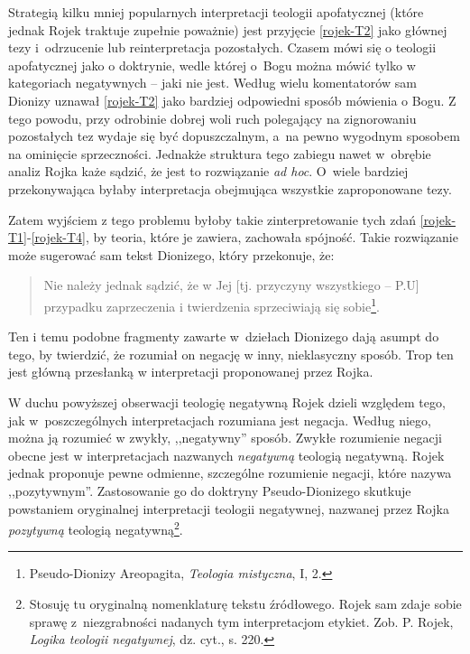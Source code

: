 Strategią kilku mniej popularnych interpretacji teologii apofatycznej
(które jednak Rojek traktuje zupełnie poważnie)
 jest przyjęcie \eqref{rojek-T2} jako głównej tezy i~odrzucenie lub reinterpretacja pozostałych.
Czasem
mówi się o teologii apofatycznej jako o doktrynie, wedle
której o~Bogu można mówić tylko w kategoriach negatywnych -- jaki nie
jest. Według wielu komentatorów sam Dionizy uznawał \eqref{rojek-T2} jako bardziej odpowiedni sposób mówienia o Bogu.
Z tego powodu, przy odrobinie dobrej woli ruch polegający na zignorowaniu pozostałych tez wydaje się być
dopuszczalnym, a~na pewno wygodnym sposobem na ominięcie sprzeczności. Jednakże struktura tego zabiegu nawet w~obrębie analiz Rojka każe sądzić, że jest to rozwiązanie \textit{ad hoc}. O~wiele
bardziej przekonywająca byłaby interpretacja obejmująca wszystkie
zaproponowane tezy.

Zatem wyjściem z tego problemu byłoby takie zinterpretowanie tych zdań \eqref{rojek-T1}-\eqref{rojek-T4},
by teoria, które je zawiera, zachowała spójność. Takie rozwiązanie może
sugerować sam tekst Dionizego, który przekonuje, że:

\begin{quote}
    Nie należy jednak sądzić, że w Jej [tj. przyczyny wszystkiego -- P.U]
przypadku zaprzeczenia i twierdzenia sprzeciwiają się
sobie\footnote{Pseudo-Dionizy Areopagita, \textit{Teologia mistyczna},
 I, 2.}.
\end{quote}
Ten i temu podobne fragmenty zawarte w~dziełach Dionizego dają asumpt do tego, by twierdzić, że rozumiał on negację w inny, nieklasyczny sposób.
Trop ten jest główną przesłanką w interpretacji proponowanej przez
Rojka.



W duchu powyższej obserwacji teologię negatywną Rojek dzieli względem tego, jak
w~poszczególnych interpretacjach rozumiana jest negacja. Według niego,
można ją rozumieć w zwykły, ,,negatywny'' sposób. Zwykłe rozumienie
negacji obecne jest w interpretacjach nazwanych \textit{negatywną}
teologią negatywną. Rojek jednak proponuje pewne odmienne, szczególne
rozumienie negacji, które nazywa ,,pozytywnym''. Zastosowanie go do
doktryny Pseudo-Dionizego skutkuje powstaniem oryginalnej interpretacji teologii negatywnej, nazwanej przez Rojka
\textit{pozytywną} teologią negatywną\footnote{Stosuję tu oryginalną nomenklaturę
tekstu źródłowego. Rojek sam zdaje sobie sprawę z~niezgrabności nadanych
tym interpretacjom etykiet. Zob. P. Rojek, \textit{Logika teologii negatywnej}, dz. cyt., s. 220.}.








